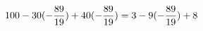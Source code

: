 \documentclass[preview]{standalone}
\begin{document}
\begin{align*}
\special{dvisvgm:raw <g id='unique000'>}100 - 30 (- \frac{89}{19}) + 40 (- \frac{89}{19}) = 3 - 9 (- \frac{89}{19}) + 8\special{dvisvgm:raw </g>}
\end{align*}
\end{document}
